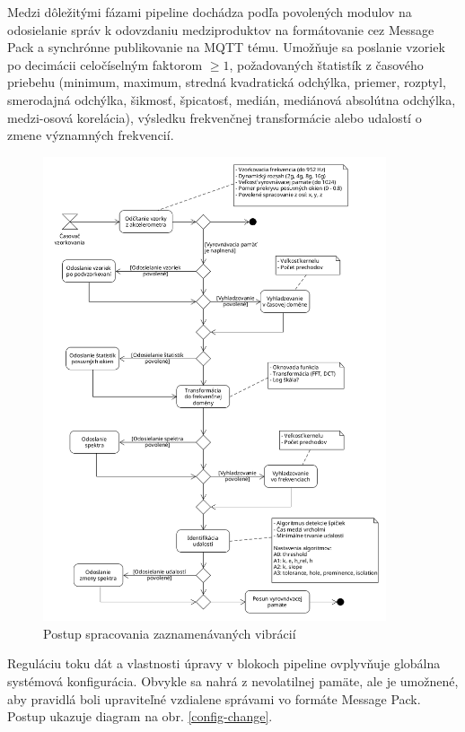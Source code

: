 Medzi dôležitými fázami pipeline dochádza podľa povolených modulov na odosielanie správ k odovzdaniu medziproduktov na formátovanie
cez Message Pack a synchrónne publikovanie na MQTT tému. Umožňuje sa poslanie vzoriek po decimácii celočíselným faktorom $\geq 1$, 
požadovaných štatistík z časového priebehu (minimum, maximum, stredná kvadratická odchýlka, priemer, rozptyl, smerodajná odchýlka,
šikmosť, špicatosť, medián, mediánová absolútna odchýlka, medzi-osová korelácia), výsledku frekvenčnej transformácie alebo udalostí 
o zmene významných frekvencií.

\begin{figure}[h]
	\centering
	\includegraphics[width=0.9\textwidth]{figures/design/pipeline.png}
	\caption{Postup spracovania zaznamenávaných vibrácií}
	\label{pipeline}
\end{figure}

Reguláciu toku dát a vlastnosti úpravy v blokoch pipeline ovplyvňuje globálna systémová konfigurácia. Obvykle sa nahrá
z nevolatilnej pamäte, ale je umožnené, aby pravidlá boli upraviteľné vzdialene správami vo formáte Message Pack. 
Postup ukazuje diagram na obr. \ref{config-change}.

